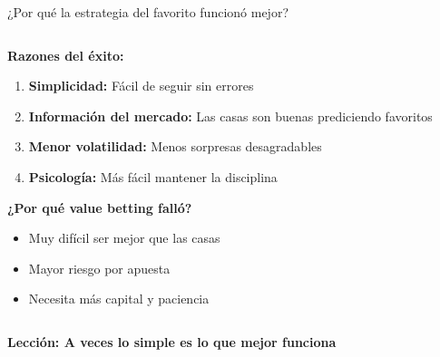 \documentclass[aspectratio=169]{beamer}
\begin{document}
\begin{frame}{¿Por qué la estrategia del favorito funcionó mejor?}
\begin{columns}
\begin{column}{0.6\textwidth}
\textbf{Razones del éxito:}

\begin{enumerate}
\item \textcolor{verdeganancia}{\textbf{Simplicidad:}} Fácil de seguir sin errores
\item \textcolor{azulprincipal}{\textbf{Información del mercado:}} Las casas son buenas prediciendo favoritos
\item \textcolor{naranjaatencion}{\textbf{Menor volatilidad:}} Menos sorpresas desagradables
\item \textcolor{verdeganancia}{\textbf{Psicología:}} Más fácil mantener la disciplina
\end{enumerate}

\vspace{0.5cm}
\textbf{¿Por qué value betting falló?}
\begin{itemize}
\item Muy difícil ser mejor que las casas
\item Mayor riesgo por apuesta
\item Necesita más capital y paciencia
\end{itemize}
\end{column}

\begin{column}{0.4\textwidth}
\end{column}
\end{columns}

\vspace{0.5cm}
\begin{center}
\textbf{Lección: A veces lo simple es lo que mejor funciona}
\end{center}
\end{frame}
\end{document}
